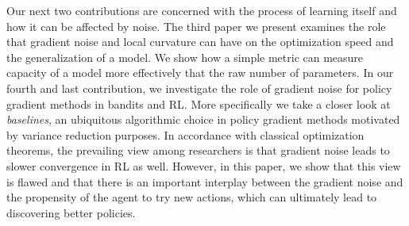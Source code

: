 Our next two contributions are concerned with the process of learning itself and how it can be affected by noise. The third paper we present examines the role that gradient noise and local curvature can have on the optimization speed and the generalization of a model. We show how a simple metric can measure capacity of a model more effectively that the raw number of parameters.
In our fourth and last contribution, we investigate the role of gradient noise for policy gradient methods in bandits and RL. More specifically we take a closer look at \emph{baselines}, an ubiquitous algorithmic choice in policy gradient methods motivated by variance reduction purposes. In accordance with classical optimization theorems, the prevailing view among researchers is that gradient noise leads to slower convergence in RL as well. However, in this paper, we show that this view is flawed and that there is an important interplay between the gradient noise and the propensity of the agent to try new actions, which can ultimately lead to discovering better policies.



















